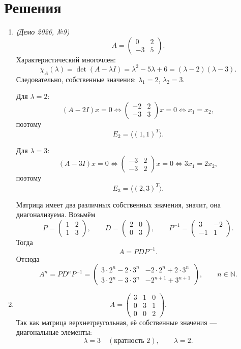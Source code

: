 \section*{Решения}

\begin{enumerate}
\item \textit{(Демо 2026, №9)}
\[
A=\begin{pmatrix}0&2\\-3&5\end{pmatrix}.
\]
Характеристический многочлен:
\[
\chi_A(\lambda)=\det(A-\lambda I)=\lambda^2-5\lambda+6=(\lambda-2)(\lambda-3).
\]
Следовательно, собственные значения: \(\lambda_1=2\), \(\lambda_2=3\).

Для \(\lambda=2\):
\[
(A-2I)x=0 \iff
\begin{pmatrix}-2&2\\-3&3\end{pmatrix}x=0
\iff x_1=x_2,
\]
поэтому
\[
E_{2}=\langle (1,1)^T\rangle.
\]

Для \(\lambda=3\):
\[
(A-3I)x=0 \iff
\begin{pmatrix}-3&2\\-3&2\end{pmatrix}x=0
\iff 3x_1=2x_2,
\]
поэтому
\[
E_{3}=\langle (2,3)^T\rangle.
\]

Матрица имеет два различных собственных значения, значит, она диагонализуема. Возьмём
\[
P=\begin{pmatrix}1&2\\1&3\end{pmatrix},\qquad
D=\begin{pmatrix}2&0\\0&3\end{pmatrix},\qquad
P^{-1}=\begin{pmatrix}3&-2\\-1&1\end{pmatrix}.
\]
Тогда
\[
A=PDP^{-1}.
\]
Отсюда
\[
A^n=PD^nP^{-1}
=\begin{pmatrix}
3\cdot 2^n-2\cdot 3^n & -2\cdot 2^n+2\cdot 3^n\\
3\cdot 2^n-3\cdot 3^n & -2^{n+1}+3^{n+1}
\end{pmatrix},\qquad n\in\mathbb N.
\]

\item
\[
A=\begin{pmatrix}3&1&0\\0&3&1\\0&0&2\end{pmatrix}.
\]
Так как матрица верхнетреугольная, её собственные значения --- диагональные элементы:
\[
\lambda=3 \quad (\text{кратность }2),\qquad \lambda=2.
\]


\end{enumerate}
